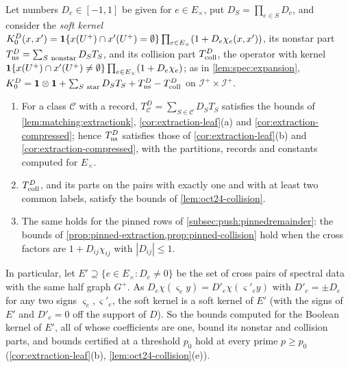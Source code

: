 \begin{corollary}\label{cor:soft-kernels}
Let numbers $D_e\in[-1,1]$ be given for $e\in E_\times$, put
$D_S=\prod_{e\in S}D_e$, and consider the \emph{soft kernel}
$K^D_0(x,x')=\mathbf 1\{x(U^+)\cap x'(U^+)=\emptyset\}\prod_{e\in E_\times}(1+D_e\chi_e(x,x'))$,
its nonstar part $T^D_{\rm ns}=\sum_{S\ \rm nonstar}D_ST_S$, and its collision part
$T^D_{\rm coll}$, the operator with kernel
$\mathbf 1\{x(U^+)\cap x'(U^+)\ne\emptyset\}\prod_{e\in E_\times}(1+D_e\chi_e)$; as in
\cref{lem:spec:expansion},
$K^D_0=\mathbf 1\otimes\mathbf 1+\sum_{S\ \rm star}D_ST_S+T^D_{\rm ns}-T^D_{\rm coll}$ on
$\mathcal I^+\times\mathcal I^+$.
\begin{enumerate}[label=\textup{(\alph*)}]
\item For a class $\mathcal C$ with a record, $T^D_{\mathcal C}=\sum_{S\in\mathcal C}D_ST_S$
 satisfies the bounds of \cref{lem:matching:extractionk}, \cref{cor:extraction-leaf}(a)
 and \cref{cor:extraction-compressed}; hence $T^D_{\rm ns}$ satisfies those of
 \cref{cor:extraction-leaf}(b) and \cref{cor:extraction-compressed}, with the
 partitions, records and constants computed for $E_\times$.
\item $T^D_{\rm coll}$, and its parts on the pairs with exactly one and with at least
 two common labels, satisfy the bounds of \cref{lem:oct24-collision}.
\item The same holds for the pinned rows of \cref{subsec:push:pinnedremainder}: the
 bounds of \cref{prop:pinned-extraction,prop:pinned-collision} hold when the cross
 factors are $1+D_{ij}\chi_{ij}$ with $|D_{ij}|\le1$.
\end{enumerate}
In particular, let $E'\supseteq\{e\in E_\times:D_e\ne0\}$ be the set of cross pairs of
spectral data with the same half graph $G^+$. As $D_e\chi(\varsigma_ey)=D'_e\chi(\varsigma'_ey)$
with $D'_e=\pm D_e$ for any two signs $\varsigma_e,\varsigma'_e$, the soft kernel is a soft
kernel of $E'$ (with the signs of $E'$ and $D'_e=0$ off the support of $D$). So the
bounds computed for the Boolean kernel of $E'$, all of whose coefficients are one,
bound its nonstar and collision parts, and bounds certified at a threshold $p_0$ hold
at every prime $p\ge p_0$ (\cref{cor:extraction-leaf}(b), \cref{lem:oct24-collision}(e)).
\end{corollary}

